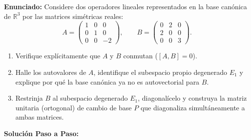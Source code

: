 \begin{ejemplobox}
    \textbf{Enunciado:} Considere dos operadores lineales representados en la base canónica de $\mathbb{R}^3$ por las matrices simétricas reales:
    \begin{equation}
        A = \begin{pmatrix} 1 & 0 & 0 \\ 0 & 1 & 0 \\ 0 & 0 & -2 \end{pmatrix}, \qquad B = \begin{pmatrix} 0 & 2 & 0 \\ 2 & 0 & 0 \\ 0 & 0 & 3 \end{pmatrix}.
    \end{equation}
    \begin{enumerate}
        \item Verifique explícitamente que $A$ y $B$ conmutan ($[A, B] = 0$).
        \item Halle los autovalores de $A$, identifique el subespacio propio degenerado $E_1$ y explique por qué la base canónica ya no es autovectorial para $B$.
        \item Restrinja $B$ al subespacio degenerado $E_1$, diagonalícelo y construya la matriz unitaria (ortogonal) de cambio de base $P$ que diagonaliza simultáneamente a ambas matrices.
    \end{enumerate}

    \textbf{Solución Paso a Paso:}


\end{ejemplobox}
